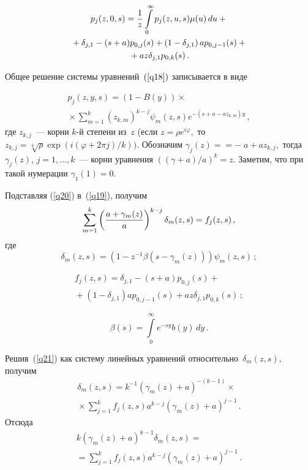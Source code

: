 \begin{multicols}{2}
\vspace*{-12pt}

\noindent
\begin{multline}
p_{j}(z,0,s)=\displaystyle\frac{\displaystyle 1\mathstrut}{\displaystyle z\mathstrut}\int\limits_{0}^{\infty}p_{j}(z,u,s)\mu(u)\,du+{}\\
{}+\delta_{j,1}-(s+a)p_{0,j}(s)+
\left(1-\delta_{j,1}\right)ap_{0,j-1}(s)+{}\\
{}+az\delta_{j,1}p_{0,k}(s)\,.
\label{q19}
\end{multline}

Общее решение системы уравнений~$(\ref{q18})$ записывается в виде

\noindent
\begin{multline}
p_{j}(z,y,s)=
(1-B(y)) \times{}\\
{}\times  \sum_{m=1}^{k}(z_{k,m})^{k-j}\psi_{m}(z,s)e^{-(s+a-az_{k,m})y}\,,
\label{q20}
\end{multline}
где $z_{k,j}$~---  корни $k$-й степени из~$z$ 
(если $z=\rho e^{i\varphi},$ то $z_{k,j}=\sqrt[k]{\rho}\exp\left(i(\varphi+2 \pi j)/k\right))$.
Обозначим $\gamma_{j}(z)=$\linebreak $=-\;a+az_{k,j},$ тогда $\gamma_{j}(z)$, $j=1,\ldots , k $~--- корни уравнения 
$((\gamma+a)/a)^{k}=z$.
Заметим, что при такой нумерации $\gamma_{1}(1)=0$.

Подставляя (\ref{q20}) в~(\ref{q19}), получим
\begin{equation}
\sum_{m=1}^{k}\left(\displaystyle\frac{\displaystyle a+\gamma_{m}(z)\mathstrut}{\displaystyle a\mathstrut}\right)^{k-j} 
\delta_{m}(z,s)=f_{j}(z,s)\,,
\label{q21}
\end{equation}
где
$$
\delta_{m}(z,s)=\left(1-z^{-1}\beta(s-\gamma_{m}(z))\right) \psi_{m}(z,s)\,;
$$

\vspace*{-12pt}

\noindent
\begin{multline*}
f_{j}(z,s)=\delta_{j,1}-(s+a)p_{0,j}(s)+{}\\
{}+
(1-\delta_{j,1})ap_{0,j-1}(s)+az\delta_{j,1}p_{0,k}(s)\,;
\end{multline*}

\vspace*{-12pt}

\noindent
$$
\beta(s)=\int\limits_{0}^{\infty}e^{-sy}b(y)\,dy\,.
$$

Решив~(\ref{q21}) как систему линейных уравнений относительно~$\delta_{m}(z,s),$ получим
\begin{multline*}
\delta_{m}(z,s)=k^{-1}\left(\gamma_{m}(z)+a\right)^{-(k-1)} \times{}\\
{}\times
\sum_{j=1}^{k}f_{j}(z,s)a^{k-j}\left(\gamma_{m}(z)+a\right)^{j-1}\,.
\end{multline*}
Отсюда
\begin{multline}
k(\gamma_{m}(z)+a)^{k-1}\delta_{m}(z,s)={}\\
{}=
 \sum_{j=1}^{k}f_{j}(z,s)a^{k-j}(\gamma_{m}(z)+a)^{j-1}\,.
 \label{q23}
\end{multline}


\end{multicols}
